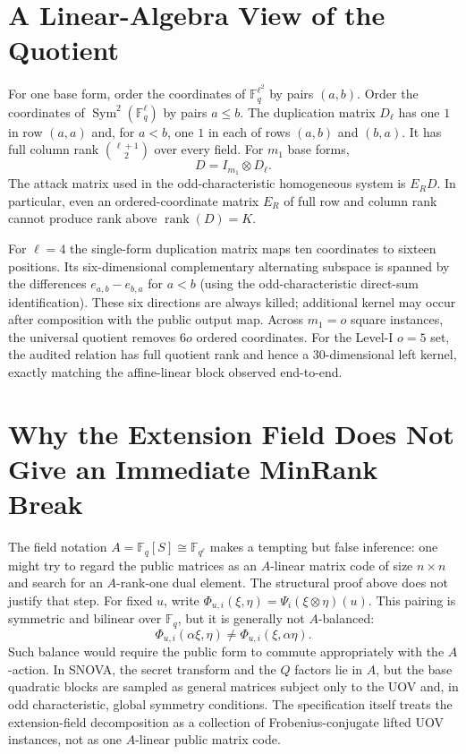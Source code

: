 \documentclass[11pt]{article}
\newcommand{\F}{\mathbb F}
\newcommand{\Sym}{\operatorname{Sym}}
\newcommand{\rank}{\operatorname{rank}}
\newcommand{\SNOVA}{\textsf{SNOVA}}
\begin{document}
\section{A Linear-Algebra View of the Quotient}\label{app:linear}

For one base form, order the coordinates of $\F_q^{\ell^2}$ by pairs $(a,b)$.  Order the coordinates of $\Sym^2(\F_q^\ell)$ by pairs $a\le b$.  The duplication matrix $D_\ell$ has one $1$ in row $(a,a)$ and, for $a<b$, one $1$ in each of rows $(a,b)$ and $(b,a)$.  It has full column rank $\binom{\ell+1}{2}$ over every field.  For $m_1$ base forms,
\[
 D=I_{m_1}\otimes D_\ell.
\]
The attack matrix used in the odd-characteristic homogeneous system is $E_RD$.  In particular, even an ordered-coordinate matrix $E_R$ of full row and column rank cannot produce rank above $\rank(D)=K$.

For $\ell=4$ the single-form duplication matrix maps ten coordinates to sixteen positions.  Its six-dimensional complementary alternating subspace is spanned by the differences $e_{a,b}-e_{b,a}$ for $a<b$ (using the odd-characteristic direct-sum identification).  These six directions are always killed; additional kernel may occur after composition with the public output map.  Across $m_1=o$ square instances, the universal quotient removes $6o$ ordered coordinates.  For the Level-I $o=5$ set, the audited relation has full quotient rank and hence a 30-dimensional left kernel, exactly matching the affine-linear block observed end-to-end.

\section{Why the Extension Field Does Not Give an Immediate MinRank Break}\label{app:noAshortcut}

The field notation $A=\F_q[S]\cong\F_{q^\ell}$ makes a tempting but false
inference: one might try to regard the public matrices as an $A$-linear matrix
code of size $n\times n$ and search for an $A$-rank-one dual element.  The
structural proof above does not justify that step.  For fixed $u$, write
$\Phi_{u,i}(\xi,\eta)=\Psi_i(\xi\otimes\eta)(u)$.  This pairing is
symmetric and bilinear over $\F_q$, but it is generally not $A$-balanced:
\[
 \Phi_{u,i}(\alpha\xi,\eta)
 \ne
 \Phi_{u,i}(\xi,\alpha\eta).
\]
Such balance would require the public form to commute appropriately with the
$A$-action.  In \SNOVA{}, the secret transform and the $Q$ factors lie in
$A$, but the base quadratic blocks are sampled as general matrices subject
only to the UOV and, in odd characteristic, global symmetry conditions.  The
specification itself treats the extension-field decomposition as a collection
of Frobenius-conjugate lifted UOV instances, not as one $A$-linear public
matrix code.
\end{document}
